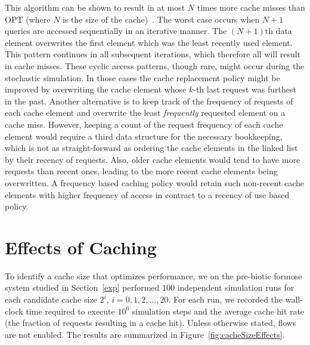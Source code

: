 This algorithm can be shown to result in at most $N$ times more cache misses than OPT (where $N$ is the size of the cache)~\cite{lru_cache_performance}. The worst case occurs when $N+1$ queries are accessed sequentially in an iterative manner. The $(N+1)$th data element overwrites the first element which was the least recently used element. This pattern continues in all subsequent iterations, which therefore all will result in cache misses. These cyclic access patterns, though rare, might occur during the stochastic simulation. In those cases the cache replacement policy might be improved by overwriting the cache element whose $k$-th last request was furthest in the past. Another alternative is to keep track of the frequency of requests of each cache element and overwrite the least \emph{frequently} requested element on a cache miss. However, keeping a count of the request frequency of each cache element would require a third data structure for the necessary bookkeeping, which is not as straight-forward as ordering the cache elements in the linked list by their recency of requests. 
Also, older cache elements would tend to have more requests than recent ones, leading to the more recent cache elements being overwritten. A frequency based caching policy would retain such non-recent cache elements with higher frequency of access in contract to a recency of use based policy.

\section{Effects of Caching}
\label{cache_effects}

To identify a cache size that optimizes performance, we on the pre-biotic formose system studied in Section~\ref{exp} performed $100$ independent simulation runs for each candidate cache size $2^i$, $i = 0, 1, 2,\dots, 20$. For each run, we recorded the wall-clock time required to execute $10^6$ simulation steps and the average cache hit rate (the fraction of requests resulting in a cache hit). Unless otherwise stated, flows are not enabled. The results are summarized in Figure~\ref{fig:cacheSizeEffects}.

